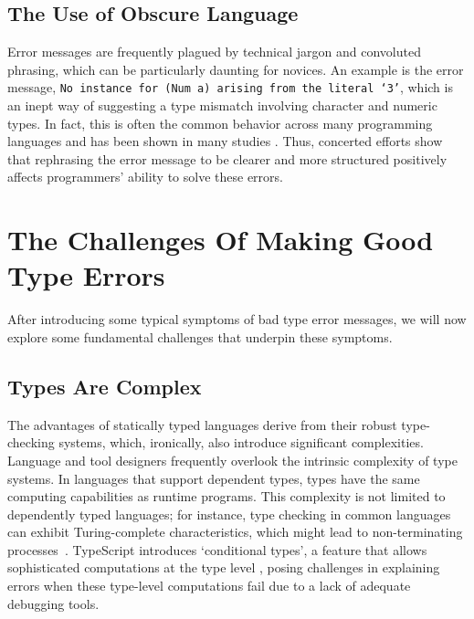 \subsection{The Use of Obscure Language}

Error messages are frequently plagued by technical jargon and convoluted phrasing, which can be particularly daunting for novices. An example is the error message, \texttt{No instance for (Num a) arising from the literal `3'}, which is an inept way of suggesting a type mismatch involving character and numeric types. In fact, this is often the common behavior across many programming languages and has been shown in many studies \cite{Barik2017-gy, Tirronen2015-nr, Prather2017-dg}. Thus, concerted efforts \cite{Becker2016-kc, Barik2014-ib}  show that rephrasing the error message to be clearer and more structured positively affects programmers' ability to solve these errors.


\section{The Challenges Of Making Good Type Errors}

After introducing some typical symptoms of bad type error messages, we will now explore some fundamental challenges that underpin these symptoms.

\subsection{Types Are Complex}

The advantages of statically typed languages derive from their robust type-checking systems, which, ironically, also introduce significant complexities. Language and tool designers frequently overlook the intrinsic complexity of type systems. In languages that support dependent types, types have the same computing capabilities as runtime programs. This complexity is not limited to dependently typed languages; for instance, type checking in common languages can exhibit Turing-complete characteristics, which might lead to non-terminating processes~\cite{Wells1999-ob}. TypeScript introduces `conditional types', a feature that allows sophisticated computations at the type level \cite{fig:ts-conditional}, posing challenges in explaining errors when these type-level computations fail due to a lack of adequate debugging tools.



